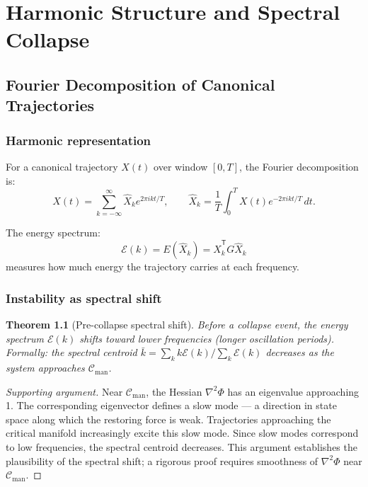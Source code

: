 \documentclass[11pt,a4paper,openany]{book}
\newtheorem{theorem}{Theorem}[chapter]
\theoremstyle{definition}
\newcommand{\T}{^{\mathsf{T}}}
\begin{document}
\part{Harmonic Structure and Spectral Collapse}

\chapter{Fourier Decomposition of Canonical Trajectories}

\section{Harmonic representation}

For a canonical trajectory $X(t)$ over window $[0, T]$, the Fourier decomposition is:
\[
X(t) = \sum_{k=-\infty}^\infty \hat X_k e^{2\pi i k t/T}, \qquad
\hat X_k = \frac{1}{T}\int_0^T X(t)e^{-2\pi ikt/T}\,dt.
\]

The energy spectrum:
\[
\mathcal{E}(k) = E(\hat X_k) = \hat X_k\T G \hat X_k
\]
measures how much energy the trajectory carries at each frequency.

\section{Instability as spectral shift}

\begin{theorem}[Pre-collapse spectral shift]
Before a collapse event, the energy spectrum $\mathcal{E}(k)$ shifts toward lower frequencies
(longer oscillation periods). Formally: the spectral centroid
$\bar k = \sum_k k\mathcal{E}(k)/\sum_k \mathcal{E}(k)$ decreases as the system approaches $\mathcal{C}_\mathrm{man}$.
\end{theorem}

\begin{proof}[Supporting argument]
Near $\mathcal{C}_\mathrm{man}$, the Hessian $\nabla^2\Phi$ has an eigenvalue approaching 1.
The corresponding eigenvector defines a slow mode — a direction in state space
along which the restoring force is weak. Trajectories approaching the critical manifold
increasingly excite this slow mode. Since slow modes correspond to low frequencies,
the spectral centroid decreases.
This argument establishes the plausibility of the spectral shift; a rigorous proof
requires smoothness of $\nabla^2\Phi$ near $\mathcal{C}_\mathrm{man}$.
\end{proof}
\end{document}
